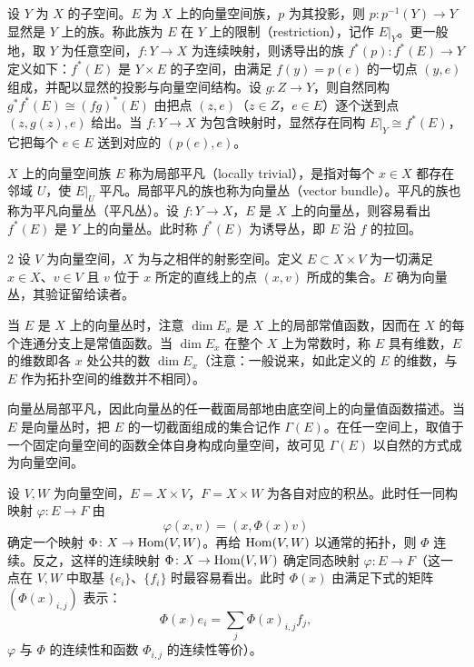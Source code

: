 设 $Y$ 为 $X$ 的子空间。$E$ 为 $X$ 上的向量空间族，$p$ 为其投影，则 $p\colon p^{-1}(Y)\to Y$ 显然是 $Y$ 上的族。称此族为 $E$ 在 $Y$ 上的限制（restriction），记作 $E|_Y$。更一般地，取 $Y$ 为任意空间，$f\colon Y\to X$ 为连续映射，则诱导出的族 $f^*(p)\colon f^*(E)\to Y$ 定义如下：$f^*(E)$ 是 $Y\times E$ 的子空间，由满足 $f(y)=p(e)$ 的一切点 $(y,e)$ 组成，并配以显然的投影与向量空间结构。设 $g\colon Z\to Y$，则自然同构 $g^*f^*(E)\cong(fg)^*(E)$ 由把点 $(z,e)$（$z\in Z$，$e\in E$）逐个送到点 $(z,g(z),e)$ 给出。当 $f\colon Y\to X$ 为包含映射时，显然存在同构 $E|_Y\cong f^*(E)$，它把每个 $e\in E$ 送到对应的 $(p(e),e)$。


$X$ 上的向量空间族 $E$ 称为局部平凡（locally trivial），是指对每个 $x\in X$ 都存在邻域 $U$，使 $E|_U$ 平凡。局部平凡的族也称为向量丛（vector bundle）。平凡的族也称为平凡向量丛（平凡丛）。设 $f\colon Y\to X$，$E$ 是 $X$ 上的向量丛，则容易看出 $f^*(E)$ 是 $Y$ 上的向量丛。此时称 $f^*(E)$ 为诱导丛，即 $E$ 沿 $f$ 的拉回。

\begin{example*}{2}
  设 $V$ 为向量空间，$X$ 为与之相伴的射影空间。定义 $E\subset X\times V$ 为一切满足 $x\in X$、$v\in V$ 且 $v$ 位于 $x$ 所定的直线上的点 $(x,v)$ 所成的集合。$E$ 确为向量丛，其验证留给读者。
\end{example*}

当 $E$ 是 $X$ 上的向量丛时，注意 $\dim E_x$ 是 $X$ 上的局部常值函数，因而在 $X$ 的每个连通分支上是常值函数。当 $\dim E_x$ 在整个 $X$ 上为常数时，称 $E$ 具有维数，$E$ 的维数即各 $x$ 处公共的数 $\dim E_x$（注意：一般说来，如此定义的 $E$ 的维数，与 $E$ 作为拓扑空间的维数并不相同）。

向量丛局部平凡，因此向量丛的任一截面局部地由底空间上的向量值函数描述。当 $E$ 是向量丛时，把 $E$ 的一切截面组成的集合记作 $\Gamma(E)$。在任一空间上，取值于一个固定向量空间的函数全体自身构成向量空间，故可见 $\Gamma(E)$ 以自然的方式成为向量空间。


设 $V, W$ 为向量空间，$E=X\times V$，$F=X\times W$ 为各自对应的积丛。此时任一同构映射 $\varphi\colon E\to F$ 由
\[
\varphi(x,v)=(x,\Phi(x)v)
\]
确定一个映射 $\Phi\colon X\to\operatorname{Hom}(V,W)$。再给 $\operatorname{Hom}(V,W)$ 以通常的拓扑，则 $\Phi$ 连续。反之，这样的连续映射 $\Phi\colon X\to\operatorname{Hom}(V,W)$ 确定同态映射 $\varphi\colon E\to F$（这一点在 $V, W$ 中取基 $\{e_i\}$、$\{f_i\}$ 时最容易看出。此时 $\Phi(x)$ 由满足下式的矩阵 $(\Phi(x)_{i,j})$ 表示：
\[
\Phi(x)e_i=\sum_j\Phi(x)_{i,j}f_j,
\]
$\varphi$ 与 $\Phi$ 的连续性和函数 $\Phi_{i,j}$ 的连续性等价）。

